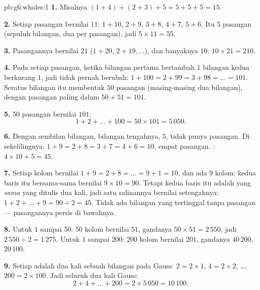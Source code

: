 \begin{solution}{pb:g6:wholes:1}
\textbf{1.} Misalnya $(1 + 4) + (2 + 3) + 5 = 5 + 5 + 5 =
15$.

\textbf{2.} Setiap pasangan bernilai $11$: $1 + 10$, $2 + 9$, $3 + 8$,
$4 + 7$, $5 + 6$. Itu $5$ pasangan (sepuluh bilangan, dua per
pasangan), jadi  $5 \times 11 = 55$.

\textbf{3.} Pasangannya bernilai $21$ ($1 + 20$, $2 + 19, \dots$), dan
banyaknya $10$: $10 \times 21 = 210$.

\textbf{4.} Pada setiap pasangan, ketika bilangan pertama bertambah
$1$ bilangan kedua berkurang $1$, jadi  tidak pernah
berubah: $1 + 100 = 2 + 99 = 3 + 98 = \dots = 101$. Seratus bilangan
itu membentuk $50$ pasangan (masing-masing dua bilangan), dengan
pasangan paling dalam $50 + 51 = 101$.

\textbf{5.} $50$ pasangan bernilai $101$:
\[
1 + 2 + \dots + 100 = 50 \times 101 = 5\,050 .
\]

\textbf{6.} Dengan sembilan bilangan, bilangan tengahnya, $5$, tidak
punya pasangan. Di sekelilingnya: $1 + 9 = 2 + 8 = 3 + 7 = 4 + 6 = 10$,
empat pasangan. : $4 \times 10 + 5 = 45$.

\textbf{7.} Setiap kolom bernilai $1 + 9 = 2 + 8 = \dots =
9 + 1 = 10$, dan ada $9$ kolom: kedua baris itu bersama-sama bernilai
$9 \times 10 = 90$. Tetapi kedua baris itu adalah  yang
\emph{sama} yang ditulis dua kali, jadi satu salinannya bernilai
setengahnya: $1 + 2 + \dots + 9 = 90 \div 2 = 45$. Tidak ada bilangan
yang tertinggal tanpa pasangan --- pasangannya persis di bawahnya.

\textbf{8.} Untuk $1$ sampai $50$: $50$ kolom bernilai $51$, 
gandanya $50 \times 51 = 2\,550$, jadi  $2\,550 \div 2 = 1\,275$.
Untuk $1$ sampai $200$: $200$ kolom bernilai $201$,  gandanya
$40\,200$,  $20\,100$.

\textbf{9.} Setiap  adalah dua kali sebuah bilangan pada
 Gauss: $2 = 2 \times 1$, $4 = 2 \times 2$, \dots,
$200 = 2 \times 100$. Jadi seluruh  dua kali  Gauss:
\[
2 + 4 + \dots + 200 = 2 \times 5\,050 = 10\,100 .
\]


\end{solution}
